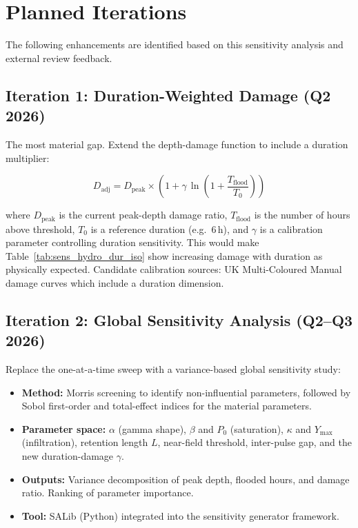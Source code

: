 \documentclass[11pt,a4paper]{article}
\begin{document}
\section{Planned Iterations}
\label{sec:iterations}

The following enhancements are identified based on this sensitivity analysis and
external review feedback.

\subsection{Iteration 1: Duration-Weighted Damage (Q2 2026)}

The most material gap.  Extend the depth-damage function to include a duration
multiplier:

\begin{equation}
    D_{\mathrm{adj}} = D_{\mathrm{peak}} \times \left(1 + \gamma \,\ln\!\left(1 + \frac{T_{\mathrm{flood}}}{T_0}\right)\right)
\end{equation}

\noindent where $D_{\mathrm{peak}}$ is the current peak-depth damage ratio,
$T_{\mathrm{flood}}$ is the number of hours above threshold, $T_0$ is a reference
duration (e.g.\ 6\,h), and $\gamma$ is a calibration parameter controlling
duration sensitivity.  This would make Table~\ref{tab:sens_hydro_dur_iso} show
increasing damage with duration as physically expected.  Candidate calibration
sources: UK Multi-Coloured Manual damage curves which include a duration dimension.

\subsection{Iteration 2: Global Sensitivity Analysis (Q2--Q3 2026)}

Replace the one-at-a-time sweep with a variance-based global sensitivity study:

\begin{itemize}[nosep]
    \item \textbf{Method:} Morris screening to identify non-influential parameters,
          followed by Sobol first-order and total-effect indices for the material
          parameters.
    \item \textbf{Parameter space:} $\alpha$ (gamma shape), $\beta$ and $P_0$
          (saturation), $\kappa$ and $Y_{\max}$ (infiltration), retention length
          $L$, near-field threshold, inter-pulse gap, and the new duration-damage
          $\gamma$.
    \item \textbf{Outputs:} Variance decomposition of peak depth, flooded hours,
          and damage ratio.  Ranking of parameter importance.
    \item \textbf{Tool:} SALib (Python) integrated into the sensitivity generator
          framework.
\end{itemize}
\end{document}

